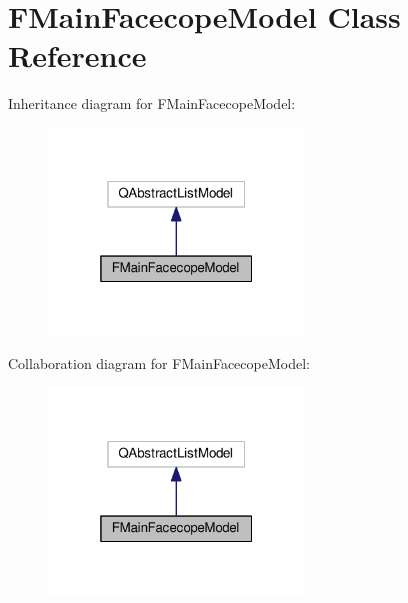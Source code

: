 \hypertarget{classFMainFacecopeModel}{}\section{F\+Main\+Facecope\+Model Class Reference}
\label{classFMainFacecopeModel}


Inheritance diagram for F\+Main\+Facecope\+Model\+:
\nopagebreak
\begin{figure}[H]
\begin{center}
\leavevmode
\includegraphics[width=193pt]{classFMainFacecopeModel__inherit__graph}
\end{center}
\end{figure}


Collaboration diagram for F\+Main\+Facecope\+Model\+:
\nopagebreak
\begin{figure}[H]
\begin{center}
\leavevmode
\includegraphics[width=193pt]{classFMainFacecopeModel__coll__graph}
\end{center}
\end{figure}
